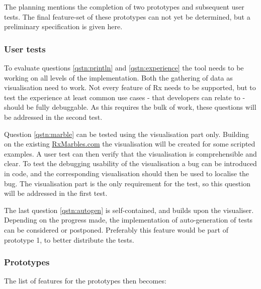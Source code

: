 The planning mentions the completion of two prototypes and subsequent
user tests.  The final feature-set of these prototypes can not yet be
determined, but a preliminary specification is given here.

\subsubsection{User tests}%
To evaluate questions %
\ref{qstn:println} and %
\ref{qstn:experience} the tool needs to be working on all levels of the
implementation.  Both the gathering of data as visualisation need to
work.  Not every feature of Rx needs to be supported, but to test the
experience at least common use cases - that developers can relate to -
should be fully debuggable.  As this requires the bulk of work, these
questions will be addressed in the second test.

Question%
\ref{qstn:marble} can be tested using the visualisation part only.
Building on the existing \href{http://rxmarbles.com}{RxMarbles.com} the
visualisation will be created for some scripted examples.  A user test
can then verify that the visualisation is comprehensible and clear.  To
test the debugging usability of the visualisation a bug can be
introduced in code, and the corresponding visualisation should then be
used to localise the bug.  The visualisation part is the only
requirement for the test, so this question will be addressed in the
first test.

The last question%
\ref{qstn:autogen} is self-contained, and builds upon the visualiser.
Depending on the progress made, the implementation of auto-generation of
tests can be considered or postponed.  Preferably this feature would be
part of prototype 1, to better distribute the tests.

\subsubsection{Prototypes} The list of features for the prototypes then
becomes:

